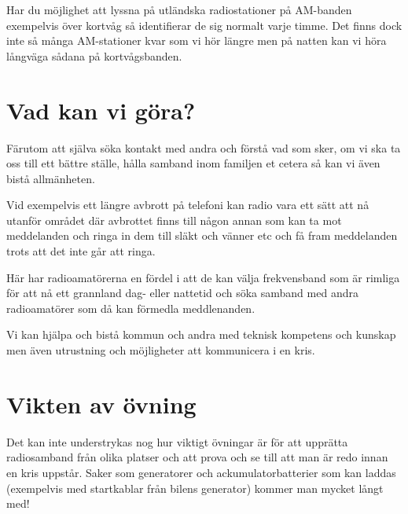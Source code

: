 Har du möjlighet att lyssna på utländska radiostationer på AM-banden
exempelvis över kortvåg så identifierar de sig normalt varje timme. Det finns
dock inte så många AM-stationer kvar som vi hör längre men på natten kan vi
höra långväga sådana på kortvågsbanden.

\section{Vad kan vi göra?}

Färutom att själva söka kontakt med andra och förstå vad som sker, om vi ska
ta oss till ett bättre ställe, hålla samband inom familjen et cetera så kan vi
även bistå allmänheten.

Vid exempelvis ett längre avbrott på telefoni kan radio vara ett sätt att nå
utanför området där avbrottet finns till någon annan som kan ta mot
meddelanden och ringa in dem till släkt och vänner etc och få fram meddelanden
trots att det inte går att ringa.

Här har radioamatörerna en fördel i att de kan välja frekvensband som är
rimliga för att nå ett grannland dag- eller nattetid och söka samband med
andra radioamatörer som då kan förmedla meddlenanden.

Vi kan hjälpa och bistå kommun och andra med teknisk kompetens och kunskap men
även utrustning och möjligheter att kommunicera i en kris.


\section{Vikten av övning}

Det kan inte understrykas nog hur viktigt övningar är för att upprätta
radiosamband från olika platser och att prova och se till att man är redo
innan en kris uppstår. Saker som generatorer och ackumulatorbatterier som kan
laddas (exempelvis med startkablar från bilens generator) kommer man mycket
långt med!

